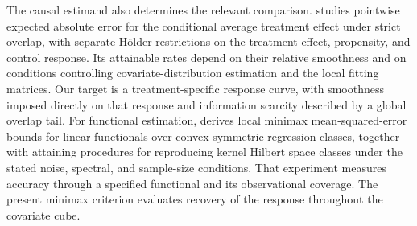 The causal estimand also determines the relevant comparison. \citet[Theorems 1--2 and Remark 11]{KennedyBalakrishnanRobinsWasserman2024} studies pointwise expected absolute error for the conditional average treatment effect under strict overlap, with separate Hölder restrictions on the treatment effect, propensity, and control response. Its attainable rates depend on their relative smoothness and on conditions controlling covariate-distribution estimation and the local fitting matrices. Our target is a treatment-specific response curve, with smoothness imposed directly on that response and information scarcity described by a global overlap tail. For functional estimation, \citet[Theorems 1--3]{MouDingWainwrightBartlett2023} derives local minimax mean-squared-error bounds for linear functionals over convex symmetric regression classes, together with attaining procedures for reproducing kernel Hilbert space classes under the stated noise, spectral, and sample-size conditions. That experiment measures accuracy through a specified functional and its observational coverage. The present minimax criterion evaluates recovery of the response throughout the covariate cube.
